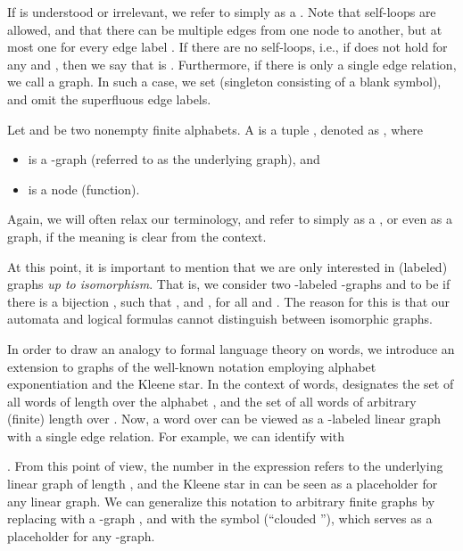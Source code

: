 \documentclass[a4paper,11pt,twoside]{report} \pdfoutput=1
\begin{document}
If  is understood or irrelevant, we refer to  simply as a
. Note that self-loops are allowed, and that there can be
multiple edges from one node to another, but at most one for every
edge label . If there are no self-loops, i.e., if 
does not hold for any  and , then we say that  is
. Furthermore, if there is only a single edge
relation, we call  a  graph. In such a case, we set
 (singleton consisting of a blank symbol), and omit the
superfluous edge labels.
  
\begin{definition}
  Let  and  be two nonempty finite alphabets. A
   is a tuple , denoted as
  , where
  \begin{itemize}
  \item  is a -graph (referred to as the underlying graph),
    and
  \item  is a node  (function).
  \end{itemize}
\end{definition}

Again, we will often relax our terminology, and refer to  simply
as a , or even as a graph, if the meaning is clear
from the context.

At this point, it is important to mention that we are only interested
in (labeled) graphs \emph{up to isomorphism}. That is, we consider two
-labeled -graphs  and  to be  if there
is a bijection , such that , and
 \Iff , for all  and
. The reason for this is that our automata and logical formulas
cannot distinguish between isomorphic graphs.

In order to draw an analogy to formal language theory on words, we
introduce an extension to graphs of the well-known notation employing
alphabet exponentiation and the Kleene star. In the context of words,
 designates the set of all words of length  over the alphabet
, and  the set of all words of arbitrary (finite) length over
. Now, a word over  can be viewed as a -labeled linear graph
with a single edge relation. For example, we can identify
 with  \!\!. From this
point of view, the number  in the expression  refers to the
underlying linear graph of length , and the Kleene star  in
 can be seen as a placeholder for any linear graph. We can
generalize this notation to arbitrary finite graphs by replacing 
with a -graph , and  with the symbol  (“clouded
”), which serves as a placeholder for any -graph.
\end{document}

